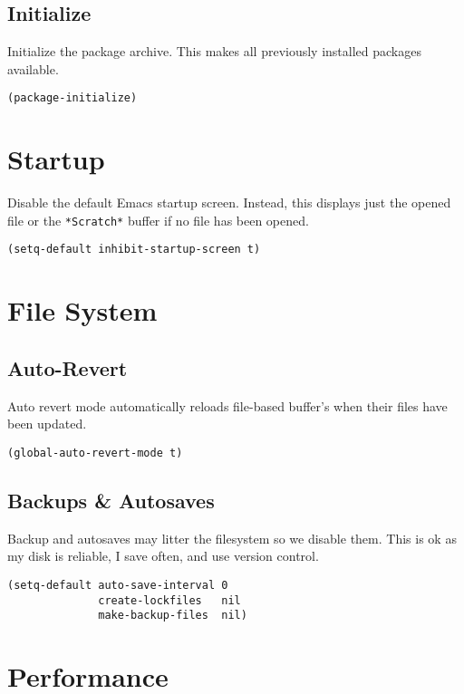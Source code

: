 \documentclass[11pt]{article}
\begin{document}
\subsection{Initialize}
\label{sec:org06bd52c}

Initialize the package archive. This makes all previously installed packages available.

\begin{verbatim}
(package-initialize)
\end{verbatim}
\section{Startup}
\label{sec:org45070f8}

Disable the default Emacs startup screen. Instead, this displays just the opened
file or the \texttt{*Scratch*} buffer if no file has been opened.

\begin{verbatim}
(setq-default inhibit-startup-screen t)
\end{verbatim}
\section{File System}
\label{sec:orgc64a768}

\subsection{Auto-Revert}
\label{sec:orge1b0e6a}

Auto revert mode automatically reloads file-based buffer's when their files have
been updated.

\begin{verbatim}
(global-auto-revert-mode t)
\end{verbatim}
\subsection{Backups \& Autosaves}
\label{sec:org903d748}

Backup and autosaves may litter the filesystem so we disable
them. This is ok as my disk is reliable, I save often, and use version
control.

\begin{verbatim}
(setq-default auto-save-interval 0
              create-lockfiles   nil
              make-backup-files  nil)
\end{verbatim}
\section{Performance}
\label{sec:org1bc33ae}
\end{document}
